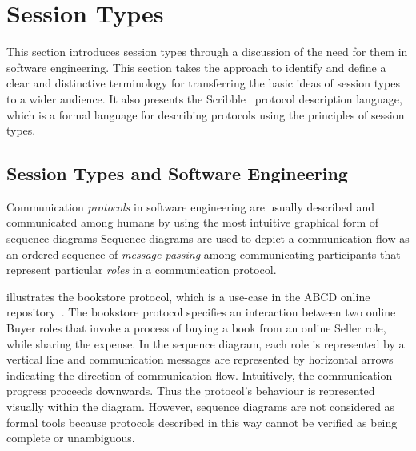
\section{Session Types}
\label{sec:session_types}


This section introduces session types through
a discussion of the need for them in
software engineering.
This section takes the approach to identify and define
a clear and distinctive terminology
for transferring the basic ideas of session types to a wider audience.
It also presents the Scribble~\cite{scribble} protocol
description language, which is a formal language for describing
protocols using the principles of session types.

\subsection{Session Types and Software Engineering}%
\label{sec:sessions_software}



Communication \emph{protocols} in software engineering
are usually described and communicated among humans
by using the most intuitive graphical form of sequence diagrams
Sequence diagrams are used to depict a communication flow as an ordered
sequence of \emph{message passing} among communicating
participants that represent particular \emph{roles} in a communication
protocol.

 illustrates the bookstore protocol, which is a use-case
in the ABCD online repository~\cite{usecase_repository}.
The bookstore protocol specifies an interaction between two online Buyer roles
that invoke a process of buying a book from an online Seller role, while
sharing the expense.
In the sequence diagram, each role is represented by a vertical line and
communication messages are represented by horizontal arrows
indicating the direction of communication flow.
Intuitively, the communication progress proceeds downwards.
Thus the protocol's behaviour is represented visually within the diagram.
However, sequence diagrams are not considered as formal tools because
protocols described in this way cannot be verified as being complete or unambiguous.

